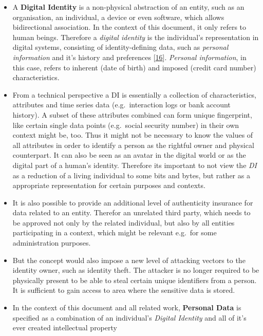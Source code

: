\documentclass[12pt,english,a4paper,titlepage,cleardoublepage=empty,dottedtoc]{report}
\begin{document}
\begin{itemize}
\item
  A \textbf{Digital Identity} is a non-physical abstraction of an
  entity, such as an organisation, an individual, a device or even
  software, which allows bidirectional association. In the context of
  this document, it only refers to human beings. Therefore a
  \emph{digital identity} is the individual's representation in digital
  systems, consisting of identity-defining data, such as \emph{personal
  information} and it's history and preferences
  {[}\protect\hyperlink{ref-whitepaper_2012_the-value-of-our-digital-identity_definition}{16}{]}.
  \emph{Personal information}, in this case, refers to inherent (date of
  birth) and imposed (credit card number) characteristics.
\item
  From a technical perspective a DI is essentially a collection of
  characteristics, attributes and time series data (e.g.~interaction
  logs or bank account history). A subset of these attributes combined
  can form unique fingerprint, like certain single data points
  (e.g.~social security number) in their own context might be, too. Thus
  it might not be necessary to know the values of all attributes in
  order to identify a person as the rightful owner and physical
  counterpart. It can also be seen as an avatar in the digital world or
  as the digital part of a human's identity. Therefore its important to
  not view the \emph{DI} as a reduction of a living individual to some
  bits and bytes, but rather as a appropriate representation for certain
  purposes and contexts.
\item
  It is also possible to provide an additional level of authenticity
  insurance for data related to an entity. Therefor an unrelated third
  party, which needs to be approved not only by the related individual,
  but also by all entities participating in a context, which might be
  relevant e.g.~for some administration purposes.
\item
  But the concept would also impose a new level of attacking vectors to
  the identity owner, such as identity theft. The attacker is no longer
  required to be physically present to be able to steal certain unique
  identifiers from a person. It is sufficient to gain access to area
  where the sensitive data is stored.
\item
  In the context of this document and all related work, \textbf{Personal
  Data} is specified as a combination of an individual's \emph{Digital
  Identity} and all of it's ever created intellectual property

\end{itemize}
\end{document}
